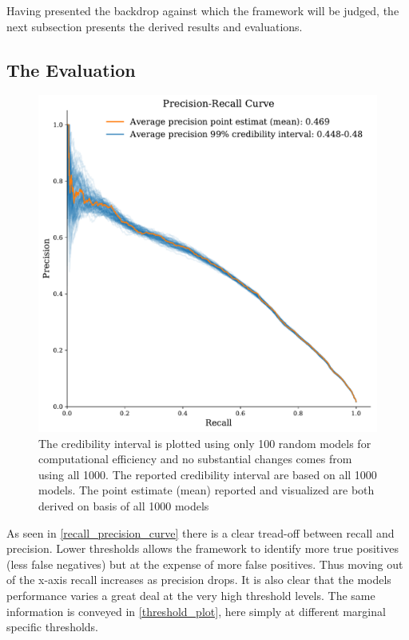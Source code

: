 \documentclass[a4paper]{article}
\begin{document}
Having presented the backdrop against which the framework will be judged, the next subsection presents the derived results and evaluations.\par

\subsection{The Evaluation}


\begin{figure}[!htb]
	\centering
	\includegraphics[scale=0.5]{pr_curve.pdf}
    \caption{\footnotesize{The credibility interval is plotted using only 100 random models for computational efficiency and no substantial changes comes from using all 1000. The reported credibility interval are based on all 1000 models. The point estimate (mean) reported and visualized are both derived on basis of all 1000 models}}\label{recall_precision_curve}
\end{figure}

As seen in \autoref{recall_precision_curve} there is a clear tread-off between recall and precision. Lower thresholds allows the framework to identify more true positives (less false negatives) but at the expense of more false positives. Thus moving out of the x-axis recall increases as precision drops. It is also clear that the models performance varies a great deal at the very high threshold levels. The same information is conveyed in \autoref{threshold_plot}, here simply at different marginal specific thresholds. 
\end{document}
